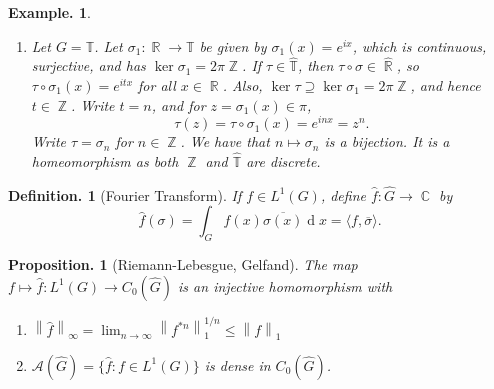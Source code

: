 \documentclass[11pt, a4paper]{memoir}
\DeclareMathOperator{\Z}{{\mathbb{Z}}}
\DeclareMathOperator{\R}{{\mathbb{R}}}
\DeclareMathOperator{\C}{{\mathbb{C}}}
\newcommand{\norm}[1]{\ensuremath{\left\lVert#1\right\rVert}}
\theoremstyle{change}
\newtheorem{proposition}[theorem]{Proposition.}
\theoremstyle{plain}
\theoremstyle{nonumberplain}
\newtheorem{definition}{Definition.}
\newtheorem{example}{Example.}
\renewcommand{\d}[1]{\ensuremath{\operatorname{d}\!{#1}}}
\newcommand{\idc}[1]{\ensuremath{\mathbf{1}_{#1}}}
\numberwithin{equation}{section}
\begin{document}
\begin{example}
\begin{enumerate}
            To see that the map is open, consider a $w^*$-open neighbourhood of $1=\sigma_0$: for $0<\epsilon<1-2/\pi$,
            \begin{align*}
                U_\epsilon &= \left\{t\in\R:\left\lvert\langle\idc{[-1,1]},\sigma_t\rangle-\langle\idc{[-1,1]},\sigma_0\rangle\right\rvert<\epsilon\right\}\\
                           &= \left\{t\in\R:\left\lvert\int_{-1}^1(e^{itx}-1)\d{x}\right\rvert<\epsilon\right\}\\
                           &= \left\{t\in\R:2\left\lvert\frac{\sin(t)}{t}-1\right\right<\epsilon\rvert\}=(-\delta,\delta)
            \end{align*}
            for some $0<\delta<\pi/2$.
            Thus $t\mapsto\sigma_t:R\to\widehat{\R}$ is open at 1.
        \item Let $G=\mathbb{T}$.
            Let $\sigma_1:\R\to\mathbb{T}$ be given by $\sigma_1(x)=e^{ix}$, which is continuous, surjective, and has $\ker\sigma_1=2\pi\Z$.
            If $\tau\in\widehat{\mathbb{T}}$, then $\tau\circ\sigma\in\widehat{\R}$, so $\tau\circ\sigma_1(x)=e^{itx}$ for all $x\in\R$.
            Also, $\ker\tau\supseteq\ker\sigma_1=2\pi\Z$, and hence $t\in\Z$.
            Write $t=n$, and for $z=\sigma_1(x)\in\pi$,
            \begin{equation*}
                \tau(z)=\tau\circ\sigma_1(x)=e^{inx}=z^n.
            \end{equation*}
            Write $\tau=\sigma_n$ for $n\in\Z$.
            We have that $n\mapsto\sigma_n$ is a bijection.
            It is a homeomorphism as both $\Z$ and $\widehat{\mathbb{T}}$ are discrete.
    \end{enumerate}
\end{example}
\begin{definition}[Fourier Transform]
    If $f\in L^1(G)$, define $\hat{f}:\widehat{G}\to\C$ by
    \begin{equation*}
        \hat{f}(\sigma)=\int_G f(x)\overline{\sigma(x)}\d{x}=\langle f,\overline{\sigma}\rangle.
    \end{equation*}
\end{definition}
\begin{proposition}[Riemann-Lebesgue, Gelfand]
    The map $f\mapsto\hat{f}:L^1(G)\to C_0(\widehat{G})$ is an injective homomorphism with
    \begin{enumerate}[nl,r]
        \item $\norm{\hat{f}}_\infty=\lim_{n\to\infty}\norm{f^{*n}}_1^{1/n}\leq\norm{f}_1$
        \item $\mathcal{A}(\widehat{G}) = \{\hat{f}:f\in L^1(G)\}$ is dense in $C_0(\widehat{G})$.
    \end{enumerate}
\end{proposition}
\end{document}
